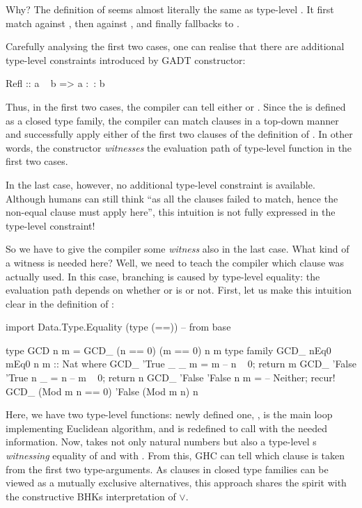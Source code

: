 \documentclass[demotion-paper.tex]{subfiles}
\begin{document}
Why? The definition of  seems almost literally the same as type-level .
It first match  against , then  against , and finally fallbacks to .

Carefully analysing the first two cases, one can realise that there are additional type-level constraints introduced by  GADT constructor:

\begin{code}
  Refl :: a ~ b => a :~: b
\end{code}

Thus, in the first two cases, the compiler can tell either  or .
Since the  is defined as a closed type family, the compiler can match clauses in a top-down manner and successfully apply either of the first two clauses of the definition of .
In other words, the constructor  \emph{witnesses} the evaluation path of type-level function  in the first two cases.

In the last case, however, no additional type-level constraint is available.
Although humans can still think ``as all the  clauses failed to match, hence the non-equal clause must apply here'', this intuition is not fully expressed in the type-level constraint!

So we have to give the compiler some \emph{witness} also in the last case.
What kind of a witness is needed here?
Well, we need to teach the compiler which clause was actually used.
In this case, branching is caused by type-level equality: the evaluation path depends on whether  or  is  or not.
First, let us make this intuition clear in the definition of :

\begin{code}
import Data.Type.Equality (type (==)) -- from base

type GCD n m = GCD_ (n == 0) (m == 0) n m
type family GCD_ nEq0 mEq0 n m :: Nat where
  GCD_ 'True  _      _ m = m  -- n ~ 0; return m
  GCD_ 'False 'True  n _ = n  -- m ~ 0; return n
  GCD_ 'False 'False n m =    -- Neither; recur!
    GCD_ (Mod m n == 0) 'False (Mod m n) n
\end{code}

Here, we have two type-level functions: newly defined one, , is the main loop implementing Euclidean algorithm, and
 is redefined to call  with the needed information.
Now,  takes not only natural numbers but also a type-level s \emph{witnessing} equality of  and  with .
From this, GHC can tell which clause is taken from the first two type-arguments.
As clauses in closed type families can be viewed as a mutually exclusive alternatives, this approach shares the spirit with the constructive BHKs interpretation of $\vee$.
\end{document}
